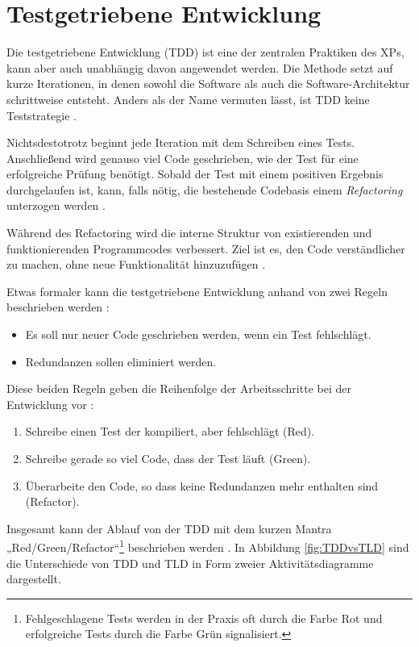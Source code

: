 
\section{Testgetriebene Entwicklung} \label{sec:tdd}

Die testgetriebene Entwicklung (TDD) ist eine der zentralen Praktiken des XPs, kann aber auch unabhängig davon angewendet werden. Die Methode setzt auf kurze Iterationen, in denen sowohl die Software als auch die Software-Architektur schrittweise entsteht. Anders als der Name vermuten lässt, ist TDD keine Teststrategie \cite{Janzen2005Test-drivenDirection}.

Nichtsdestotrotz beginnt jede Iteration mit dem Schreiben eines Tests. Anschließend wird genauso viel Code geschrieben, wie der Test für eine erfolgreiche Prüfung benötigt. Sobald der Test mit einem positiven Ergebnis durchgelaufen ist, kann, falls nötig, die bestehende Codebasis einem \textit{Refactoring} unterzogen werden \cite{Janzen2005Test-drivenDirection}.

Während des Refactoring wird die interne Struktur von existierenden und funktionierenden Programmcodes verbessert. Ziel ist es, den Code verständlicher zu machen, ohne neue Funktionalität hinzuzufügen \cite{Link2005SoftwaretestsEntwicklung}.

Etwas formaler kann die testgetriebene Entwicklung anhand von zwei Regeln beschrieben werden \cite{Beck2003TestExample}:
\begin{itemize}
\item Es soll nur neuer Code geschrieben werden, wenn ein Test fehlschlägt.
\item Redundanzen sollen eliminiert werden.
\end{itemize}
Diese beiden Regeln geben die Reihenfolge der Arbeitsschritte bei der Entwicklung vor \cite{Beck2003TestExample}:
\begin{enumerate}
\item Schreibe einen Test der kompiliert, aber fehlschlägt (Red).
\item Schreibe gerade so viel Code, dass der Test läuft (Green).
\item Überarbeite den Code, so dass keine Redundanzen mehr enthalten sind (Refactor).
\end{enumerate}
Insgesamt kann der Ablauf von der TDD mit dem kurzen Mantra „Red/Green/Refactor“\footnote{Fehlgeschlagene Tests werden in der Praxis oft durch die Farbe Rot und erfolgreiche Tests durch die Farbe Grün signalisiert.} beschrieben werden \cite{Beck2003TestExample}. In Abbildung \ref{fig:TDDvsTLD} sind die Unterschiede von TDD und TLD in Form zweier Aktivitätsdiagramme dargestellt.

